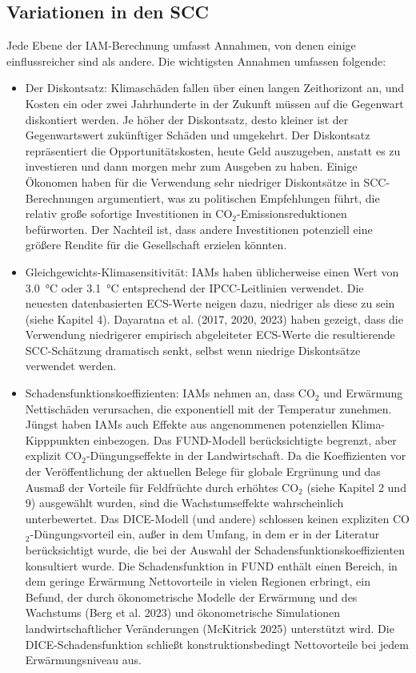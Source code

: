 \documentclass[12pt,paper=a4,DIV=12,parskip=never,chapterprefix=false,headings=standardclasses]{scrreprt}
\begin{document}
\subsection{Variationen in den SCC}
Jede Ebene der IAM-Berechnung umfasst Annahmen, von denen einige einflussreicher sind als andere. Die wichtigsten Annahmen umfassen folgende:

\begin{itemize}
\item Der Diskontsatz: Klimaschäden fallen über einen langen Zeithorizont an, und Kosten ein oder zwei Jahrhunderte in der Zukunft müssen auf die Gegenwart diskontiert werden. Je höher der Diskontsatz, desto kleiner ist der Gegenwartswert zukünftiger Schäden und umgekehrt. Der Diskontsatz repräsentiert die Opportunitätskosten, heute Geld auszugeben, anstatt es zu investieren und dann morgen mehr zum Ausgeben zu haben. Einige Ökonomen haben für die Verwendung sehr niedriger Diskontsätze in SCC-Berechnungen argumentiert, was zu politischen Empfehlungen führt, die relativ große sofortige Investitionen in CO$_2$-Emissionsreduktionen befürworten. Der Nachteil ist, dass andere Investitionen potenziell eine größere Rendite für die Gesellschaft erzielen könnten.

\item Gleichgewichts-Klimasensitivität: IAMs haben üblicherweise einen Wert von \SI{3.0}{\celsius} oder \SI{3.1}{\celsius} entsprechend der IPCC-Leitlinien verwendet. Die neuesten datenbasierten ECS-Werte neigen dazu, niedriger als diese zu sein (siehe Kapitel 4). Dayaratna et al. (2017, 2020, 2023) haben gezeigt, dass die Verwendung niedrigerer empirisch abgeleiteter ECS-Werte die resultierende SCC-Schätzung dramatisch senkt, selbst wenn niedrige Diskontsätze verwendet werden.

\item Schadensfunktionskoeffizienten: IAMs nehmen an, dass CO$_2$ und Erwärmung Nettischäden verursachen, die exponentiell mit der Temperatur zunehmen. Jüngst haben IAMs auch Effekte aus angenommenen potenziellen Klima-Kipppunkten einbezogen. Das FUND-Modell berücksichtigte begrenzt, aber explizit CO$_2$-Düngungseffekte in der Landwirtschaft. Da die Koeffizienten vor der Veröffentlichung der aktuellen Belege für globale Ergrünung und das Ausmaß der Vorteile für Feldfrüchte durch erhöhtes CO$_2$ (siehe Kapitel 2 und 9) ausgewählt wurden, sind die Wachstumseffekte wahrscheinlich unterbewertet. Das DICE-Modell (und andere) schlossen keinen expliziten CO$_2$-Düngungsvorteil ein, außer in dem Umfang, in dem er in der Literatur berücksichtigt wurde, die bei der Auswahl der Schadensfunktionskoeffizienten konsultiert wurde. Die Schadensfunktion in FUND enthält einen Bereich, in dem geringe Erwärmung Nettovorteile in vielen Regionen erbringt, ein Befund, der durch ökonometrische Modelle der Erwärmung und des Wachstums (Berg et al. 2023) und ökonometrische Simulationen landwirtschaftlicher Veränderungen (McKitrick 2025) unterstützt wird. Die DICE-Schadensfunktion schließt konstruktionsbedingt Nettovorteile bei jedem Erwärmungsniveau aus.


\end{itemize}
\end{document}
